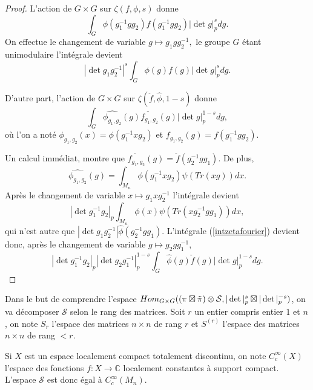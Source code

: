 \documentclass{amsart}
\DeclareMathOperator{\Hom}{\mathnormal{Hom}}
\begin{document}
\begin{proof}
L'action de $G \times G$ sur $\zeta(f,\phi,s)$ donne
\begin{equation}
\int_G \phi(g_1^{-1}gg_2)f(g_1^{-1}gg_2)|\det g|_p^s dg.
\end{equation}
On effectue le changement de variable $g \mapsto g_1gg_2^{-1},$ le groupe $G$ étant unimodulaire l'intégrale devient
\begin{equation}
|\det g_1g_2^{-1}|^s\int_G \phi(g)f(g)|\det g|_p^s dg.
\end{equation}

D'autre part, l'action de $G \times G$ sur $\zeta(\check{f}, \hat{\phi}, 1-s)$ donne
\begin{equation}
\label{intzetafourier}
\int_G \hat{\phi_{g_1,g_2}}(g)\check{f_{g_1,g_2}}(g)|\det g|_p^{1-s} dg,
\end{equation}
où l'on a noté $\phi_{g_1,g_2}(x) = \phi(g_1^{-1}xg_2)$ et $f_{g_1,g_2}(g) = f(g_1^{-1}gg_2).$

Un calcul immédiat, montre que $\check{f_{g_1,g_2}}(g) = \check{f}(g_2^{-1}gg_1)$. De plus,
\begin{equation}
\hat{\phi_{g_1,g_2}}(g) = \int_{M_n} \phi(g_1^{-1}xg_2) \psi(Tr(xg)) dx.
\end{equation}
Après le changement de variable $x \mapsto g_1xg_2^{-1}$ l'intégrale devient
\begin{equation}
|\det g_1^{-1}g_2|_p\int_{M_n} \phi(x) \psi(Tr(xg_2^{-1}gg_1)) dx,
\end{equation}
qui n'est autre que $|\det g_1g_2^{-1}|\hat{\phi}(g_2^{-1}gg_1)$.
L'intégrale (\ref{intzetafourier}) devient donc, après le changement de variable $g \mapsto g_2gg_1^{-1}$,
\begin{equation}|\det g_1^{-1}g_2|_p|\det g_2g_1^{-1}|_p^{1-s}\int_G \hat{\phi}(g)\check{f}(g)|\det g|_p^{1-s} dg.
\end{equation}
\end{proof}

Dans le but de comprendre l'espace $\Hom_{G \times G} ( (\pi \boxtimes \tilde{\pi}) \otimes \mathcal{S}, |\det|_p^s \boxtimes |\det|_p^{-s})$, on va décomposer $\mathcal{S}$ selon le rang des matrices. Soit $r$ un entier compris entier $1$ et $n$, on note $S_r$ l'espace des matrices $n \times n$ de rang $r$ et $S^{(r)}$ l'espace des matrices $n \times n$ de rang $< r$.

Si $X$ est un espace localement compact totalement discontinu, on note $C^\infty_c(X)$ l'espace des fonctions $f : X \rightarrow \mathbb{C}$ localement constantes à support compact. L'espace $\mathcal{S}$ est donc égal à $C^\infty_c(M_n)$.
\end{document}
